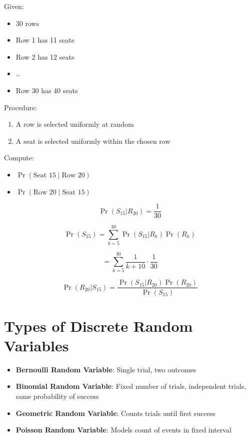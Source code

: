 \documentclass[11pt]{article}
\begin{document}
Given:
\begin{itemize}
    \item 30 rows
    \item Row 1 has 11 seats
    \item Row 2 has 12 seats
    \item \dots
    \item Row 30 has 40 seats
\end{itemize}

Procedure:
\begin{enumerate}
    \item A row is selected uniformly at random
    \item A seat is selected uniformly within the chosen row
\end{enumerate}

Compute:
\begin{itemize}
    \item $\Pr(\text{Seat 15} \mid \text{Row 20})$
    \item $\Pr(\text{Row 20} \mid \text{Seat 15})$
\end{itemize}

\[
\Pr(S_{15} | R_{20}) = \frac{1}{30}
\]

\[
\Pr(S_{15}) = \sum_{k=5}^{30} \Pr(S_{15} | R_k)\Pr(R_k)
\]

\[
= \sum_{k=5}^{30} \frac{1}{k+10} \cdot \frac{1}{30}
\]

\[
\Pr(R_{20}|S_{15}) = \frac{\Pr(S_{15}|R_{20})\Pr(R_{20})}{\Pr(S_{15})}
\]

\section{Types of Discrete Random Variables}

\begin{itemize}
    \item \textbf{Bernoulli Random Variable}: Single trial, two outcomes
    \item \textbf{Binomial Random Variable}: Fixed number of trials, independent trials, same probability of success
    \item \textbf{Geometric Random Variable}: Counts trials until first success
    \item \textbf{Poisson Random Variable}: Models count of events in fixed interval
\end{itemize}

\end{document}
